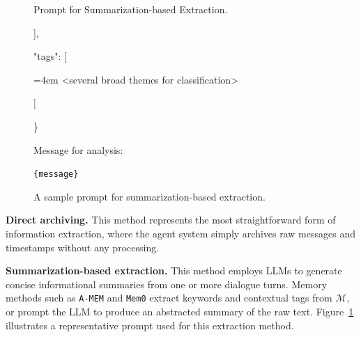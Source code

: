 \begin{figure}[h]
\begin{AIbox}{Prompt for Summarization-based Extraction.}
{\begin{tcolorbox}[colback=gray!10, colframe=gray!10, boxrule=0pt, sharp corners, left=0pt, right=0pt]
{        %
        
        
                
    \hspace*{2em}],
    
    \hspace*{2em}"tags": [
    
        {\hangindent=4em  <several broad themes for classification> \par}
        
        
        
    \hspace*{2em}]
    
\}
}

Message for analysis:

\texttt{\{message\}}
\end{tcolorbox}
}
\end{AIbox}
\caption{A sample prompt for summarization-based extraction.}
\label{fig:pmt:summary_extract}
\end{figure}

 \textbf{Direct archiving.}
This method represents the most straightforward form of information extraction, where the agent system simply archives raw messages and timestamps without any processing. 







 \textbf{Summarization-based extraction.}
This method employs LLMs to generate concise informational summaries from one or more dialogue turns. Memory methods such as {\tt A-MEM} and {\tt Mem0} extract keywords and contextual tags from $\mathcal{M}$, or prompt the LLM to produce an abstracted summary of the raw text. Figure~\ref{fig:pmt:summary_extract} illustrates a representative prompt used for this extraction method.





